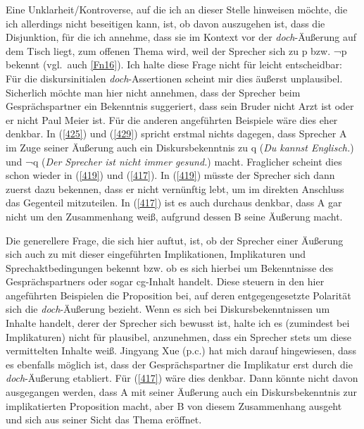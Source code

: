 Eine Unklarheit/Kontroverse, auf die ich an dieser Stelle hinweisen möchte, die ich allerdings nicht beseitigen kann, ist, ob davon auszugehen ist, dass die Disjunktion, für die ich annehme, dass sie im Kontext vor der \textit{doch}-Äußerung auf dem Tisch liegt, zum offenen Thema wird, weil der Sprecher sich zu p bzw. ¬p bekennt (vgl.\ auch \ref{Fn16}). Ich halte diese Frage nicht für leicht entscheidbar: Für die diskursinitialen \textit{doch}-Assertionen scheint mir dies äußerst unplausibel. Sicherlich möchte man hier nicht annehmen, dass der Sprecher beim Gesprächspartner ein Bekenntnis suggeriert, dass sein Bruder nicht Arzt ist oder er nicht Paul Meier ist. Für die anderen angeführten Beispiele wäre dies eher denkbar. In (\ref{425}) und (\ref{429}) spricht erstmal nichts dagegen, dass Sprecher A im Zuge seiner Äußerung auch ein Diskursbekenntnis zu q (\textit{Du kannst Englisch.}) und ¬q (\textit{Der Sprecher ist nicht immer gesund.}) macht. Fraglicher scheint dies schon wieder in (\ref{419}) und (\ref{417}). In (\ref{419}) müsste der Sprecher sich dann zuerst dazu bekennen, dass er nicht vernünftig lebt, um im direkten Anschluss das Gegenteil mitzuteilen. In (\ref{417}) ist es auch durchaus denkbar, dass A gar nicht um den Zusammenhang weiß, aufgrund dessen B seine Äußerung macht.\largerpage

Die generellere Frage, die sich hier auftut, ist, ob der Sprecher einer Äußerung sich auch zu mit dieser eingeführten  Implikationen, Implikaturen  und Sprechaktbedingungen  bekennt bzw. ob es sich hierbei um Bekenntnisse des Gesprächspartners oder sogar cg-Inhalt handelt. Diese steuern in den hier angeführten Beispielen die Proposition bei, auf deren entgegengesetzte Polarität sich die \textit{doch}-Äuße\-rung bezieht. Wenn es sich bei Diskursbekenntnissen  um Inhalte handelt, derer der Sprecher sich bewusst ist, halte ich es (zumindest bei Implikaturen) nicht für plausibel, anzunehmen, dass ein Sprecher stets um diese vermittelten Inhalte weiß. Jingyang Xue (p.c.) hat mich darauf hingewiesen, dass es ebenfalls möglich ist, dass der Gesprächspartner die Implikatur erst durch die \textit{doch}-Äußerung etabliert. Für (\ref{417}) wäre dies denkbar. Dann könnte nicht davon ausgegangen werden, dass A mit seiner Äußerung auch ein Diskursbekenntnis zur implikatierten Proposition macht, aber B von diesem Zusammenhang ausgeht und sich aus seiner Sicht das Thema eröffnet.

